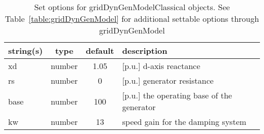 \begin{table}[ht]
\centering
\begin{tabular}{p{5cm} c c p{7cm}}
\hline
string(s) & type & default & description \\
\hline
xd & number & 1.05 & [p.u.] d-axis reactance\\
rs & number & 0 & [p.u.] generator resistance\\
base & number & 100 & [p.u.]  the operating base of the generator\\
kw & number & 13 & speed gain for the damping system\\
\hline
\end{tabular}
\caption{Set options for gridDynGenModelClassical objects. See Table~\ref{table:gridDynGenModel} for additional settable options through gridDynGenModel}
\label{table:gridDynGenModelClassical}
\end{table}
